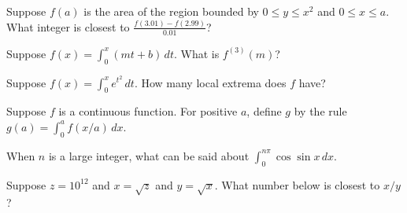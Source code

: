 \documentclass{ximera}
\newcommand{\recommendation}[1]{}
\begin{document}
\begin{problem}
\recommendation{Vic}
  Suppose $f(a)$ is the area of the region bounded by $0 \leq y \leq x^2$ and $0 \leq x \leq a$.  What integer is closest to $\frac{f(3.01) - f(2.99)}{0.01}$?
  \begin{multipleChoice}
  \end{multipleChoice}
\end{problem}


\begin{problem}
\recommendation{Vic}
  Suppose $f(x) = \int_0^x \left( mt + b \right) \, dt$.  What is $f^{(3)}(m)$?
  \begin{multipleChoice}
  \end{multipleChoice}
\end{problem}


\begin{problem}
  Suppose $f(x) = \int_0^x e^{t^2} \, dt$.  How many local extrema does $f$ have?
  \begin{multipleChoice}
  \end{multipleChoice}
\end{problem}

\begin{problem}
  Suppose $f$ is a continuous function.  For positive $a$, define $g$ by the rule $g(a) = \int_0^a f(x/a) \, dx$.
  \begin{multipleChoice}
  \end{multipleChoice}
\end{problem}

\begin{problem}
  When $n$ is a large integer, what can be said about $\int_0^{n \pi} \cos \sin x \, dx$.
  \begin{multipleChoice}
  \end{multipleChoice}
\end{problem}

\begin{problem}
  Suppose $z = 10^{12}$ and $x = \sqrt{z}$ and $y = \sqrt{x}$.  What number below is closest to $x/y$?
  \begin{multipleChoice}
  \end{multipleChoice}
\end{problem}
\end{document}
